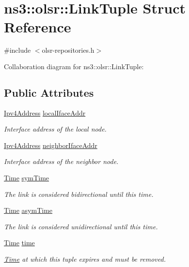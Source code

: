 \hypertarget{structns3_1_1olsr_1_1LinkTuple}{}\section{ns3\+:\+:olsr\+:\+:Link\+Tuple Struct Reference}
\label{structns3_1_1olsr_1_1LinkTuple}


{\ttfamily \#include $<$olsr-\/repositories.\+h$>$}



Collaboration diagram for ns3\+:\+:olsr\+:\+:Link\+Tuple\+:
\subsection*{Public Attributes}
\begin{DoxyCompactItemize}
\item 
\hyperlink{classns3_1_1Ipv4Address}{Ipv4\+Address} \hyperlink{structns3_1_1olsr_1_1LinkTuple_a338a610555f55dcd06dbc0d1794df537}{local\+Iface\+Addr}
\begin{DoxyCompactList}\small\item\em Interface address of the local node. \end{DoxyCompactList}\item 
\hyperlink{classns3_1_1Ipv4Address}{Ipv4\+Address} \hyperlink{structns3_1_1olsr_1_1LinkTuple_af96017826789616c7bf4f59a193f3939}{neighbor\+Iface\+Addr}
\begin{DoxyCompactList}\small\item\em Interface address of the neighbor node. \end{DoxyCompactList}\item 
\hyperlink{classns3_1_1Time}{Time} \hyperlink{structns3_1_1olsr_1_1LinkTuple_ae436ab46606d9bc58e9304a53a6e3d0a}{sym\+Time}
\begin{DoxyCompactList}\small\item\em The link is considered bidirectional until this time. \end{DoxyCompactList}\item 
\hyperlink{classns3_1_1Time}{Time} \hyperlink{structns3_1_1olsr_1_1LinkTuple_ac8d4e5ae7c51626ae015419fa30dd059}{asym\+Time}
\begin{DoxyCompactList}\small\item\em The link is considered unidirectional until this time. \end{DoxyCompactList}\item 
\hyperlink{classns3_1_1Time}{Time} \hyperlink{structns3_1_1olsr_1_1LinkTuple_a240c13ecdb4b42f3aedaf66184b9328e}{time}
\begin{DoxyCompactList}\small\item\em \hyperlink{classns3_1_1Time}{Time} at which this tuple expires and must be removed. \end{DoxyCompactList}\end{DoxyCompactItemize}


